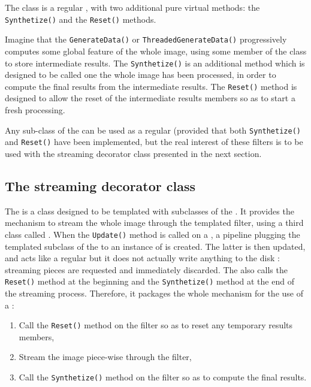 The  class is a regular
, with two additional pure virtual
methods: the \verb?Synthetize()? and the \verb?Reset()? methods.

Imagine that the \verb?GenerateData()? or
\verb?ThreadedGenerateData()? progressively computes some global
feature of the whole image, using some member of the class to store
intermediate results. The \verb?Synthetize()? is an additional method
which is designed to be called one the whole image has been processed,
in order to compute the final results from the intermediate
results. The \verb?Reset()? method is designed to allow the reset of
the intermediate results members so as to start a fresh processing.

Any sub-class of the  can be used
as a regular  (provided that both
\verb?Synthetize()? and \verb?Reset()? have been implemented, but the
real interest of these filters is to be used with the streaming
decorator class presented in the next section.

\subsection{The streaming decorator class}

The  is a class
designed to be templated with subclasses of the
. It provides the mechanism to
stream the whole image through the templated filter, using a third
class called . When the
\verb?Update()? method is called on a
, a pipeline
plugging the templated subclass of the
 to an instance of
 is created. The latter is
then updated, and acts like a regular
 but it does not actually write
anything to the disk : streaming pieces are requested and immediately
discarded. The 
also calls the \verb?Reset()? method at the beginning and the
\verb?Synthetize()? method at the end of the streaming
process. Therefore, it packages the whole mechanism for the use of a
:
\begin{enumerate}
\item Call the \verb?Reset()? method on the filter so as to reset any temporary
  results members,
\item Stream the image piece-wise through the filter,
\item Call the \verb?Synthetize()? method on the filter so as to
  compute the final results.
\end{enumerate}

